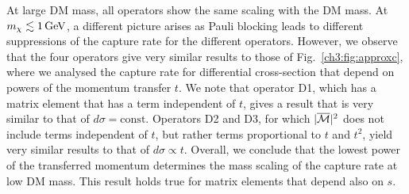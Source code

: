At large DM mass, all operators show the same scaling with the DM mass. At  $m_\chi\lesssim1{\rm \,GeV}$, a different picture arises as Pauli blocking leads to different suppressions of the capture rate for the different operators. However, we observe that the four operators give very similar results to those of Fig.~\ref{ch3:fig:approxc}, where we analysed the capture rate for differential cross-section that depend on powers of the momentum transfer $t$.  We note that operator D1, which has a matrix element that has a term independent of $t$, gives a result that is very similar to that of $d\sigma=\mathrm{const}$. Operators D2 and D3, for which $|\overline{\mathcal M}|^2$ does not include terms independent of $t$, but rather terms proportional to $t$ and $t^2$, yield very similar results to that of $d\sigma\propto t$. 
Overall, we conclude that the lowest power of the transferred momentum determines the mass scaling of the capture rate at low DM  mass.
This result holds true for matrix elements that depend also on $s$. 


